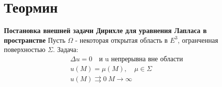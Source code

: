 \documentclass[11pt,a4paper, fqlen]{article}
\begin{document}
\section{Теормин}
\textbf{Постановка внешней задачи Дирихле для уравнения Лапласа в пространстве}
Пусть $\varOmega$ - некоторая открытая область в $E^3$, огранченная поверхностью $\varSigma$. 
Задача:
\begin{gather*}
\Delta u = 0 \quad \text{и u непрерывна вне области} \\
u(M) = \mu(M), \quad \mu \in \varSigma \\
u(M) \rightrightarrows 0 \ M \rightarrow \infty 
\end{gather*} 
\end{document}
